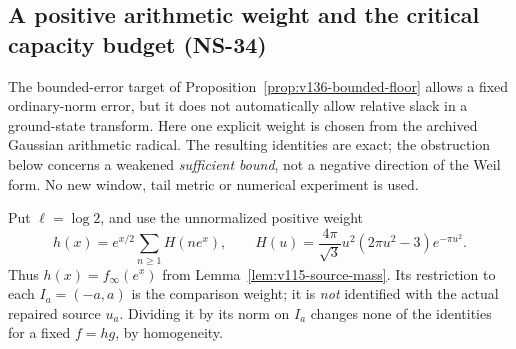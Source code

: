 \subsection*{A positive arithmetic weight and the critical capacity budget (NS-34)}

The bounded-error target of Proposition~\ref{prop:v136-bounded-floor}
allows a fixed ordinary-norm error, but it does not automatically allow
relative slack in a ground-state transform. Here one explicit weight is
chosen from the archived Gaussian arithmetic radical. The resulting
identities are exact; the obstruction below concerns a weakened
\emph{sufficient bound}, not a negative direction of the Weil form.
No new window, tail metric or numerical experiment is used.

Put $\ell=\log2$, and use the unnormalized positive weight
\begin{equation}\label{eq:v150-weight}
 h(x)=e^{x/2}\sum_{n\ge1}H(ne^x),\qquad
 H(u)=\frac{4\pi}{\sqrt3}u^2(2\pi u^2-3)e^{-\pi u^2}.
\end{equation}
Thus $h(x)=f_\infty(e^x)$ from Lemma~\ref{lem:v115-source-mass}.
Its restriction to each $I_a=(-a,a)$ is the comparison weight; it is
\emph{not} identified with the actual repaired source $u_a$. Dividing
it by its norm on $I_a$ changes none of the identities for a fixed
$f=hg$, by homogeneity.

